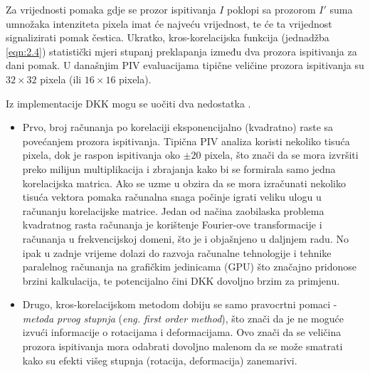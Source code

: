 \par
Za vrijednosti pomaka gdje se prozor ispitivanja $I$ poklopi sa prozorom $I'$ suma umnožaka intenziteta pixela imat će najveću vrijednost, te će ta vrijednost signalizirati pomak čestica. Ukratko, kros-korelacijska funkcija (jednadžba \ref{eqn:2.4}) statistički mjeri stupanj preklapanja između dva prozora ispitivanja za dani pomak. U današnjim PIV evaluacijama tipične veličine prozora ispitivanja su $32 \times 32$ pixela (ili $16 \times 16$ pixela).
\par
Iz implementacije DKK mogu se uočiti dva nedostatka \cite{raffel2018_book}. 
\begin{itemize}[topsep=0pt, itemsep=0em]
	\item Prvo, broj računanja po korelaciji eksponencijalno (kvadratno) raste  sa povećanjem prozora ispitivanja. Tipična PIV analiza koristi nekoliko tisuća pixela, dok je raspon ispitivanja oko $\pm 20$ pixela, što znači da se mora izvršiti preko milijun multiplikacija i zbrajanja kako bi se formirala samo jedna korelacijska matrica. Ako se uzme u obzira da se mora izračunati nekoliko tisuća vektora pomaka računalna snaga počinje igrati veliku ulogu u računanju korelacijske matrice. Jedan od načina zaobilaska problema kvadratnog rasta računanja je korištenje Fourier-ove transformacije i računanja u frekvencijskoj domeni, što je i objašnjeno u daljnjem radu. No ipak u zadnje vrijeme dolazi do razvoja računalne tehnologije i tehnike paralelnog računanja na grafičkim jedinicama (GPU) što značajno pridonose brzini kalkulacija, te potencijalno čini DKK dovoljno brzim za primjenu.
	\item Drugo, kros-korelacijskom metodom dobiju se samo pravocrtni pomaci - \textit{metoda prvog stupnja} (\textit{eng. first order method}), što znači da je ne moguće izvući informacije o rotacijama i deformacijama. Ovo znači da se veličina prozora ispitivanja mora odabrati dovoljno malenom da se može smatrati kako su efekti višeg stupnja (rotacija, deformacija) zanemarivi.
\end{itemize}
\FloatBarrier
